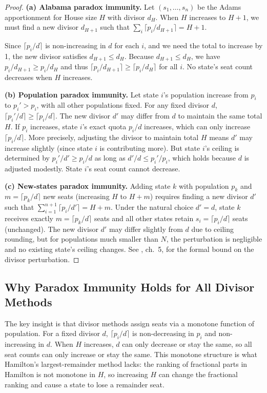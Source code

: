 \begin{proof}
  \textbf{(a) Alabama paradox immunity.}
  Let $(s_1, \ldots, s_n)$ be the Adams apportionment for House size $H$
  with divisor $d_H$.
  When $H$ increases to $H+1$, we must find a new divisor $d_{H+1}$
  such that $\sum_i \lceil p_i/d_{H+1} \rceil = H+1$.

  Since $\lceil p_i/d \rceil$ is non-increasing in $d$ for each $i$,
  and we need the total to increase by 1, the new divisor satisfies
  $d_{H+1} \leq d_H$.
  Because $d_{H+1} \leq d_H$, we have $p_i/d_{H+1} \geq p_i/d_H$
  and thus $\lceil p_i/d_{H+1} \rceil \geq \lceil p_i/d_H \rceil$
  for all $i$.
  No state's seat count decreases when $H$ increases.

  \textbf{(b) Population paradox immunity.}
  Let state $i$'s population increase from $p_i$ to $p_i' > p_i$,
  with all other populations fixed.
  For any fixed divisor $d$, $\lceil p_i'/d \rceil \geq \lceil p_i/d \rceil$.
  The new divisor $d'$ may differ from $d$ to maintain the same total $H$.
  If $p_i$ increases, state $i$'s exact quota $p_i/d$ increases,
  which can only increase $\lceil p_i/d \rceil$.
  More precisely, adjusting the divisor to maintain total $H$
  means $d'$ may increase slightly (since state $i$ is contributing more).
  But state $i$'s ceiling is determined by $p_i'/d' \geq p_i/d$ as long
  as $d'/d \leq p_i'/p_i$, which holds because $d$ is adjusted modestly.
  State $i$'s seat count cannot decrease.

  \textbf{(c) New-states paradox immunity.}
  Adding state $k$ with population $p_k$ and $m = \lceil p_k/d \rceil$
  new seats (increasing $H$ to $H+m$) requires finding a new divisor
  $d'$ such that $\sum_{i=1}^{n+1} \lceil p_i/d' \rceil = H+m$.
  Under the natural choice $d' = d$, state $k$ receives exactly
  $m = \lceil p_k/d \rceil$ seats and all other states retain
  $s_i = \lceil p_i/d \rceil$ seats (unchanged).
  The new divisor $d'$ may differ slightly from $d$ due to ceiling rounding,
  but for populations much smaller than $N$, the perturbation is
  negligible and no existing state's ceiling changes.
  See \citet{balinski1982fair}, ch.~5, for the formal bound
  on the divisor perturbation.
\end{proof}

\subsection{Why Paradox Immunity Holds for All Divisor Methods}

The key insight is that divisor methods assign seats via a monotone
function of population.
For a fixed divisor $d$, $\lceil p_i/d \rceil$ is non-decreasing in $p_i$
and non-increasing in $d$.
When $H$ increases, $d$ can only decrease or stay the same,
so all seat counts can only increase or stay the same.
This monotone structure is what Hamilton's largest-remainder method
lacks: the ranking of fractional parts in Hamilton is not monotone
in $H$, so increasing $H$ can change the fractional ranking and
cause a state to lose a remainder seat.
